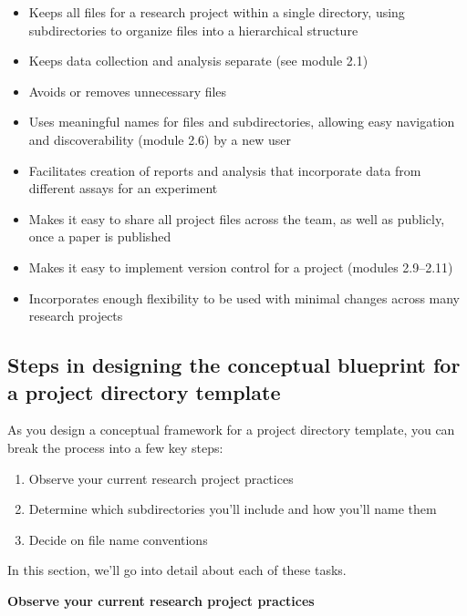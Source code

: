 \documentclass[]{tufte-book}
\providecommand{\tightlist}{%
  \setlength{\itemsep}{0pt}\setlength{\parskip}{0pt}}
\begin{document}
\begin{itemize}
\tightlist
\item
  Keeps all files for a research project within a single directory, using
  subdirectories to organize files into a hierarchical structure
\item
  Keeps data collection and analysis separate (see module 2.1)
\item
  Avoids or removes unnecessary files
\item
  Uses meaningful names for files and subdirectories, allowing easy navigation
  and discoverability (module 2.6) by a new user
\item
  Facilitates creation of reports and analysis that incorporate data from
  different assays for an experiment
\item
  Makes it easy to share all project files across the team, as well as
  publicly, once a paper is published
\item
  Makes it easy to implement version control for a project (modules 2.9--2.11)
\item
  Incorporates enough flexibility to be used with minimal changes across many
  research projects
\end{itemize}

\subsection{Steps in designing the conceptual blueprint for a project directory template}\label{steps-in-designing-the-conceptual-blueprint-for-a-project-directory-template}

As you design a conceptual framework for a project directory template, you
can break the process into a few key steps:

\begin{enumerate}
\def\labelenumi{\arabic{enumi}.}
\tightlist
\item
  Observe your current research project practices
\item
  Determine which subdirectories you'll include and how you'll name them
\item
  Decide on file name conventions
\end{enumerate}

In this section, we'll go into detail about each of these tasks.

\textbf{Observe your current research project practices}
\end{document}
